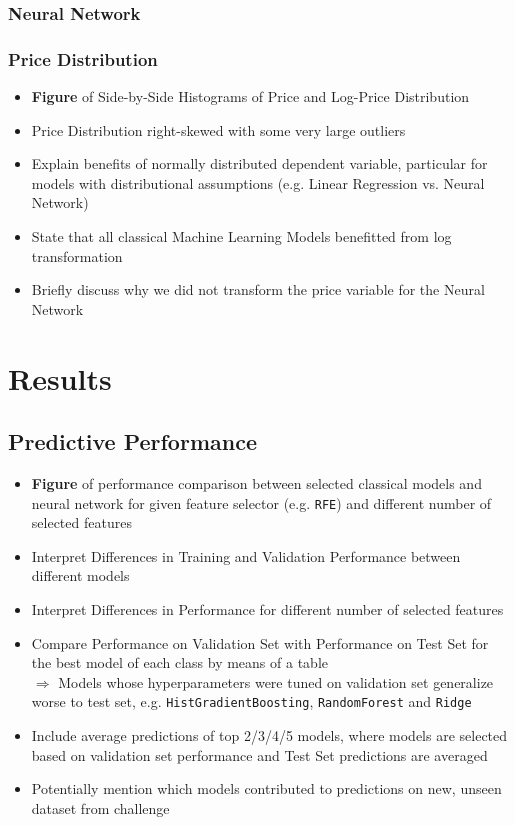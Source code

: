 \documentclass[12pt, letterpaper]{article}
\begin{document}
\subsubsection{Neural Network} %


\subsubsection{Price Distribution} %
\begin{itemize}
    \item \textbf{Figure} of Side-by-Side Histograms of Price and Log-Price Distribution
    \item Price Distribution right-skewed with some very large outliers
    \item Explain benefits of normally distributed dependent variable, particular for models with distributional assumptions (e.g. Linear Regression vs. Neural Network)
    \item State that all classical Machine Learning Models benefitted from log transformation
    \item Briefly discuss why we did not transform the price variable for the Neural Network
\end{itemize}


\section{Results} %

\subsection{Predictive Performance} %
\begin{itemize}
    \item \textbf{Figure} of performance comparison between selected classical models and neural network for given feature selector (e.g. \texttt{RFE}) and different number of selected features
    \item Interpret Differences in Training and Validation Performance between different models
    \item Interpret Differences in Performance for different number of selected features
    \item Compare Performance on Validation Set with Performance on Test Set for the best model of each class by means of a table \\
          $\Rightarrow$ Models whose hyperparameters were tuned on validation set generalize worse to test set, e.g. \texttt{HistGradientBoosting}, \texttt{RandomForest} and \texttt{Ridge}
    \item Include average predictions of top 2/3/4/5 models, where models are selected based on validation set performance and Test Set predictions are averaged
    \item Potentially mention which models contributed to predictions on new, unseen dataset from challenge
\end{itemize}
\end{document}

